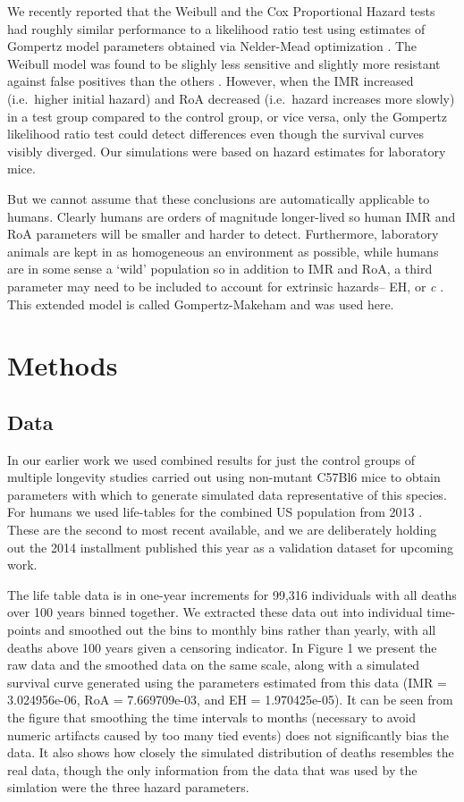 \documentclass[review, authoryear]{elsarticle}
\begin{document}
We recently reported that the Weibull and the Cox Proportional Hazard
tests had roughly similar performance to a likelihood ratio test using
estimates of Gompertz model parameters obtained via Nelder-Mead
optimization \citep{NelderSimplexMethodFunctionMinimization1965}. The
Weibull model was found to be slighly less sensitive and slightly more
resistant against false positives than the others
\citep{bokov2017riskmodels}. However, when the IMR increased
(i.e.~higher initial hazard) and RoA decreased (i.e.~hazard increases
more slowly) in a test group compared to the control group, or vice
versa, only the Gompertz likelihood ratio test could detect differences
even though the survival curves visibly diverged. Our simulations were
based on hazard estimates for laboratory mice.

But we cannot assume that these conclusions are automatically applicable
to humans. Clearly humans are orders of magnitude longer-lived so human
IMR and RoA parameters will be smaller and harder to detect.
Furthermore, laboratory animals are kept in as homogeneous an
environment as possible, while humans are in some sense a `wild'
population so in addition to IMR and RoA, a third parameter may need to
be included to account for extrinsic hazards-- EH, or \emph{c} . This
extended model is called Gompertz-Makeham and was used here.

\section{Methods}\label{methods}

\subsection{Data}\label{data}

In our earlier work we used combined results for just the control groups
of multiple longevity studies carried out using non-mutant C57Bl6 mice
to obtain parameters with which to generate simulated data
representative of this species. For humans we used life-tables for the
combined US population from 2013 \citep{arias_united_2017b}. These are
the second to most recent available, and we are deliberately holding out
the 2014 installment published this year \citep{arias_united_2017b} as a
validation dataset for upcoming work.

The life table data is in one-year increments for 99,316 individuals
with all deaths over 100 years binned together. We extracted these data
out into individual time-points and smoothed out the bins to monthly
bins rather than yearly, with all deaths above 100 years given a
censoring indicator. In Figure 1 we present the raw data and the
smoothed data on the same scale, along with a simulated survival curve
generated using the parameters estimated from this data (IMR =
3.024956e-06, RoA = 7.669709e-03, and EH = 1.970425e-05). It can be seen
from the figure that smoothing the time intervals to months (necessary
to avoid numeric artifacts caused by too many tied events) does not
significantly bias the data. It also shows how closely the simulated
distribution of deaths resembles the real data, though the only
information from the data that was used by the simlation were the three
hazard parameters.
\end{document}
